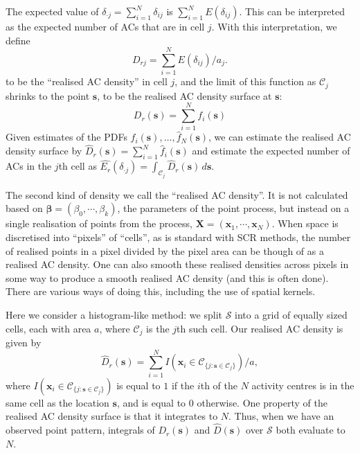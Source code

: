\documentclass[useAMS,usenatbib,referee]{biom}
\begin{document}
The expected value of $\delta_{\cdot j}=\sum_{i=1}^N\delta_{ij}$ is $\sum_{i=1}^N E(\delta_{ij})$. This can be interpreted as the expected number of ACs that are in cell $j$. With this interpretation, we define 
\begin{equation}
  D_{rj} = \sum_{i = 1}^N E(\delta_{ij})/a_j. \label{eq:realised-D_rj}
\end{equation}
\noindent 
to be the ``realised AC density'' in cell $j$, and the limit of this function as $\mathcal{C}_j$ shrinks to the point $\bm{s}$, to be the realised AC density surface at $\bm{s}$:
\begin{equation}
D_r(\bm{s})=\sum_{i=1}^N f_i(\bm{s}) \label{eq:realised-D}
\end{equation}
\noindent
Given estimates of the PDFs $\hat{f}_i(\bm{s}),\ldots,\hat{f}_N(\bm{s})$, we can estimate the realised AC density surface by $\hat{D}_r(\bm{s})=\sum_{i = 1}^N\hat{f}_i(\bm{s})$ and estimate the expected number of ACs in the $j$th cell as $\hat{E_r}(\delta_{\cdot j})=\int_{\mathcal{C}_j}\hat{D}_r(\bm{s}) \, d\bm{s}$.



The second kind of density we call the ``realised AC density''. It is not calculated based on $\bm{\beta} = (\beta_0, \cdots, \beta_k)$, the parameters of the point process, but instead on a single realisation of points from the process, $\bm{X} = (\bm{x}_1, \cdots, \bm{x}_N)$. When space is discretised into ``pixels'' of ``cells'', as is standard with SCR methods, the number of realised points in a pixel divided by the pixel area can be though of as a realised AC density. One can also smooth these realised densities across pixels in some way to produce a smooth realised AC density (and this is often done). There are various ways of doing this, including the use of spatial kernels.

Here we consider a histogram-like method: we split $\mathcal{S}$ into a grid of equally sized cells, each with area $a$, where $\mathcal{C}_j$ is the $j$th such cell. Our realised AC density is given by
\begin{equation}
\widehat{D}_r(\bm{s}) = \sum_{i = 1}^N I(\bm{x}_i \in \mathcal{C}_{\{j: \bm{s} \in \mathcal{C}_j\}})/a,
\end{equation}
where $I(\bm{x}_i \in \mathcal{C}_{\{j: \bm{s} \in \mathcal{C}_j\}})$ is equal to $1$ if the $i$th of the $N$ activity centres is in the same cell as the location $\bm{s}$, and is equal to $0$ otherwise. One property of the realised AC density surface is that it integrates to $N$. Thus, when we have an observed point pattern, integrals of $D_r(\bm{s})$ and $\widehat{D}(\bm{s})$ over $\mathcal{S}$ both evaluate to $N$.
\end{document}
